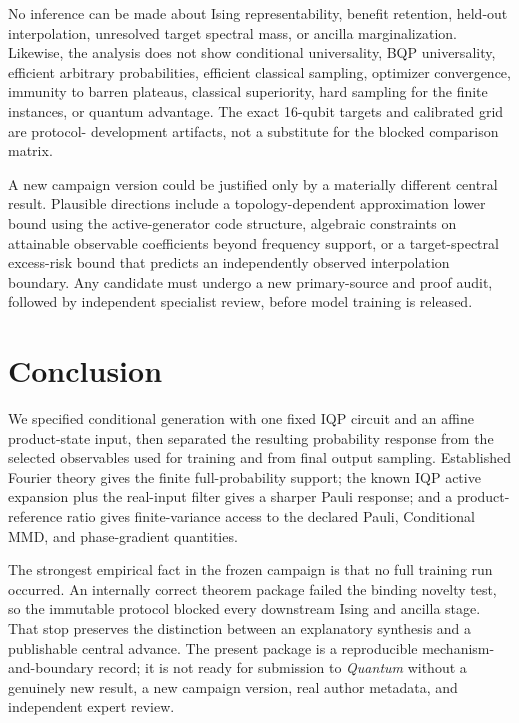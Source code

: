 \documentclass[a4paper,twocolumn,11pt,unpublished]{quantumarticle}
\begin{document}
No inference can be made about Ising representability, benefit retention,
held-out interpolation, unresolved target spectral mass, or ancilla
marginalization.  Likewise, the analysis does not show conditional
universality, BQP universality, efficient arbitrary probabilities, efficient
classical sampling, optimizer convergence, immunity to barren plateaus,
classical superiority, hard sampling for the finite instances, or quantum
advantage.  The exact 16-qubit targets and calibrated grid are protocol-
development artifacts, not a substitute for the blocked comparison matrix.

A new campaign version could be justified only by a materially different
central result.  Plausible directions include a topology-dependent
approximation lower bound using the active-generator code structure, algebraic
constraints on attainable observable coefficients beyond frequency support,
or a target-spectral excess-risk bound that predicts an independently observed
interpolation boundary.  Any candidate must undergo a new primary-source and
proof audit, followed by independent specialist review, before model training
is released.

\section{Conclusion}

We specified conditional generation with one fixed IQP circuit and an affine
product-state input, then separated the resulting probability response from
the selected observables used for training and from final output sampling.
Established Fourier theory gives the finite full-probability support; the
known IQP active expansion plus the real-input filter gives a sharper Pauli
response; and a product-reference ratio gives finite-variance access to the
declared Pauli, Conditional MMD, and phase-gradient quantities.

The strongest empirical fact in the frozen campaign is that no full training
run occurred.  An internally correct theorem package failed the binding
novelty test, so the immutable protocol blocked every downstream Ising and
ancilla stage.  That stop preserves the distinction between an explanatory
synthesis and a publishable central advance.  The present package is a
reproducible mechanism-and-boundary record; it is not ready for submission to
\emph{Quantum} without a genuinely new result, a new campaign version, real
author metadata, and independent expert review.

\onecolumn
\appendix

\end{document}
